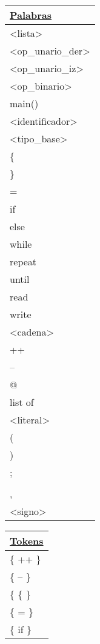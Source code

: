 \begin{center}
\begin{table}[!h]
  \centering
  \begin{tabular}{| l |}
    \hline
    \textbf{\underline{Palabras}} \\ \hline
    <lista> \\ \hline
    <op_unario_der> \\ \hline
    <op_unario_iz> \\ \hline
    <op_binario> \\ \hline
    main() \\ \hline
    <identificador> \\ \hline
    <tipo_base> \\ \hline
    \{ \\ \hline
    \} \\ \hline
    = \\ \hline
    if \\ \hline
    else \\ \hline
    while \\ \hline
    repeat \\ \hline
    until \\ \hline
    read \\ \hline
    write \\ \hline
    <cadena> \\ \hline
    ++ \\ \hline
    -- \\ \hline
    @ \\ \hline
    list of \\ \hline
    <literal> \\ \hline
    ( \\ \hline
    ) \\ \hline
    ; \\ \hline
    [ \\ \hline
    ] \\ \hline
    , \\ \hline
    <signo> \\ \hline
  \end{tabular}
  \quad
  \begin{tabular}{| l |}
    \hline
    \textbf{\underline{Tokens}} \\ \hline
    \{ ++ \} \\ \hline
    \{ -- \} \\ \hline
    \{ \{ \} \\ \hline
    \{ = \} \\ \hline
    \{ if \} \\ \hline

\end{tabular}
\end{table}
\end{center}
